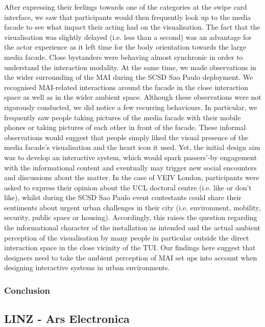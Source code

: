After expressing their feelings towards one of the categories at the swipe card interface, we saw that participants would then frequently look up to the media facade to see what impact their acting had on the visualisation. 
The fact that the visualisation was slightly delayed (i.e. less than a second) was an advantage for the actor experience as it left time for the body orientation towards the large media facade. 
Close bystanders were behaving almost synchronic in order to understand the interaction modality.
At the same time, we made observations in the wider surrounding of the MAI during the SCSD Sao Paulo deployment.
We recognised MAI-related interactions around the facade in the close interaction space as well as in the wider ambient space. 
Although these observations were not rigorously conducted, we did notice a few recurring behaviours. In particular, we frequently saw people taking pictures of the media facade with their mobile phones or taking pictures of each other in front of the facade. 
These informal observations would suggest that people simply liked the visual presence of the media facade’s visualisation and the heart icon it used. 
Yet, the initial design aim was to develop an interactive system, which would spark passers’-by engagement with the informational content and eventually may trigger new social encounters and discussions about the matter. 
In the case of VEIV London, participants were asked to express their opinion about the UCL doctoral centre (i.e. like or don’t like), whilst during the SCSD Sao Paulo event contestants could share their sentiments about urgent urban challenges in their city (i.e. environment, mobility, security, public space or housing). 
Accordingly, this raises the question regarding the informational character of the installation as intended and the actual ambient perception of the visualisation by many people in particular outside the direct interaction space in the close vicinity of the TUI.
Our findings here suggest that designers need to take the ambient perception of MAI set ups into account when designing interactive systems in urban environments.

\subsubsection{Conclusion}


\subsection{LINZ - Ars Electronica}


